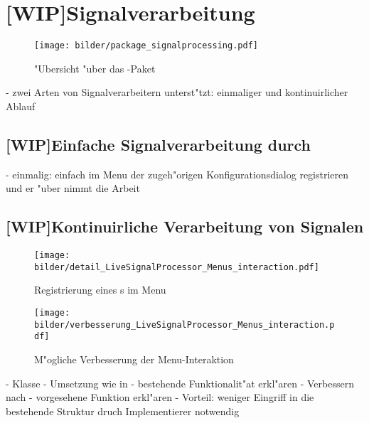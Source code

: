 \section{[WIP]Signalverarbeitung}

\begin{figure}[htb]
\centering
\texttt{[image: bilder/package\_signalprocessing.pdf]}
\caption{"Ubersicht "uber das -Paket}
\label{pic:package_signalprocessing}
\end{figure}

- zwei Arten von Signalverarbeitern unterst"tzt: einmaliger und kontinuirlicher Ablauf

\subsection{[WIP]Einfache Signalverarbeitung durch }

- einmalig: einfach im Menu der zugeh"origen Konfigurationsdialog registrieren und er "uber nimmt die Arbeit

\subsection{[WIP]Kontinuirliche Verarbeitung von Signalen}

\begin{figure}[tbh]
\centering
\texttt{[image: bilder/detail\_LiveSignalProcessor\_Menus\_interaction.pdf]}
\caption{Registrierung eines s im Menu}
\label{pic:interaction_menu_lsp}
\end{figure}
\begin{figure}[tbh]
\centering
\texttt{[image: bilder/verbesserung\_LiveSignalProcessor\_Menus\_interaction.pdf]}
\caption{M"ogliche Verbesserung der Menu-Interaktion}
\label{pic:interaction_menu_lsp_improved}
\end{figure}

- Klasse 
- Umsetzung wie in 
- bestehende Funktionalit"at erkl"aren
- Verbessern nach 
- vorgesehene Funktion erkl"aren
- Vorteil: weniger Eingriff in die bestehende Struktur druch Implementierer notwendig

